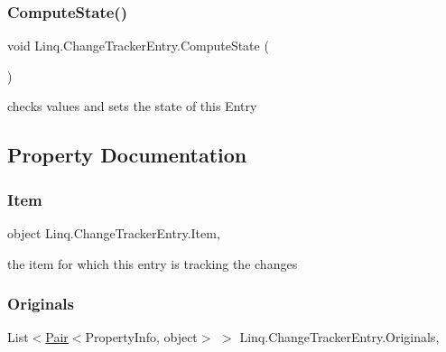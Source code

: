 \subsubsection{\texorpdfstring{Compute\+State()}{ComputeState()}}
{\footnotesize\ttfamily void Linq.\+Change\+Tracker\+Entry.\+Compute\+State (\begin{DoxyParamCaption}{ }\end{DoxyParamCaption})\hspace{0.3cm}{\ttfamily [inline]}}



checks values and sets the state of this Entry 



\subsection{Property Documentation}
\mbox{\label{class_linq_1_1_change_tracker_entry_a9286918528bb182197ebc21d391bbcf2}} 
\subsubsection{\texorpdfstring{Item}{Item}}
{\footnotesize\ttfamily object Linq.\+Change\+Tracker\+Entry.\+Item\hspace{0.3cm}{\ttfamily [get]}, {\ttfamily [set]}}



the item for which this entry is tracking the changes 

\mbox{\label{class_linq_1_1_change_tracker_entry_abb117792a18f0df8424ba7617e317e1e}} 
\subsubsection{\texorpdfstring{Originals}{Originals}}
{\footnotesize\ttfamily List$<$\mbox{\hyperlink{class_linq_1_1_change_tracker_entry_1_1_pair}{Pair}}$<$Property\+Info, object$>$ $>$ Linq.\+Change\+Tracker\+Entry.\+Originals\hspace{0.3cm}{\ttfamily [get]}, {\ttfamily [set]}}



